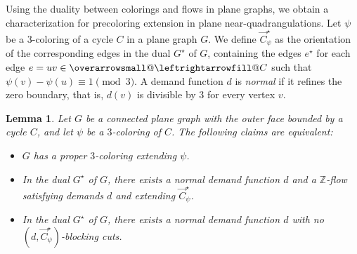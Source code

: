 \documentclass[12pt,twoside,openright,a4paper]{book}
\makeatletter
\newtheorem{lemma}[theorem]{Lemma}
\newcommand{\ovlr}{\mathpalette{\overarrowsmall@\leftrightarrowfill@}}
\newcommand{\overarrowsmall@}[3]{%
  \vbox{%
    \ialign{%
      ##\crcr
      #1{\smaller@style{#2}}\crcr
      \noalign{\nointerlineskip}%
      $\m@th\hfil#2#3\hfil$\crcr
    }%
  }%
}
\def\smaller@style#1{%
  \ifx#1\displaystyle\scriptstyle\else
    \ifx#1\textstyle\scriptstyle\else
      \scriptscriptstyle
    \fi
  \fi
}
\makeatother
\begin{document}
Using the duality between colorings and flows in plane graphs, we obtain a characterization
for precoloring extension in plane near-quadrangulations.
Let $\psi$ be a $3$-coloring of a cycle $C$ in a plane graph $G$.  We define $\vec{C}^\star_\psi$
as the orientation of the corresponding edges in the dual $G^\star$ of $G$, containing the edges $e^\star$
for each edge $e=uv\in\ovlr{C}$ such that $\psi(v)-\psi(u)\equiv 1\pmod 3$.
A demand function $d$ is \emph{normal} if it refines the zero boundary, that is, $d(v)$ is divisible by $3$
for every vertex $v$.

\begin{lemma}\label{lemma:flow-quadr}
Let $G$ be a connected plane graph with the outer face bounded by a cycle $C$, and let $\psi$ be a $3$-coloring of $C$.
The following claims are equivalent:
\begin{itemize}
\item[(a)] $G$ has a proper $3$-coloring extending $\psi$.
\item[(b)] In the dual $G^\star$ of $G$, there exists a normal demand function $d$ and a $\mathbb{Z}$-flow satisfying demands $d$
and extending $\vec{C}^\star_\psi$.
\item[(c)] In the dual $G^\star$ of $G$, there exists a normal demand function $d$ with no $(d,\vec{C}^\star_\psi)$-blocking cuts.
\end{itemize}
\end{lemma}
\end{document}
